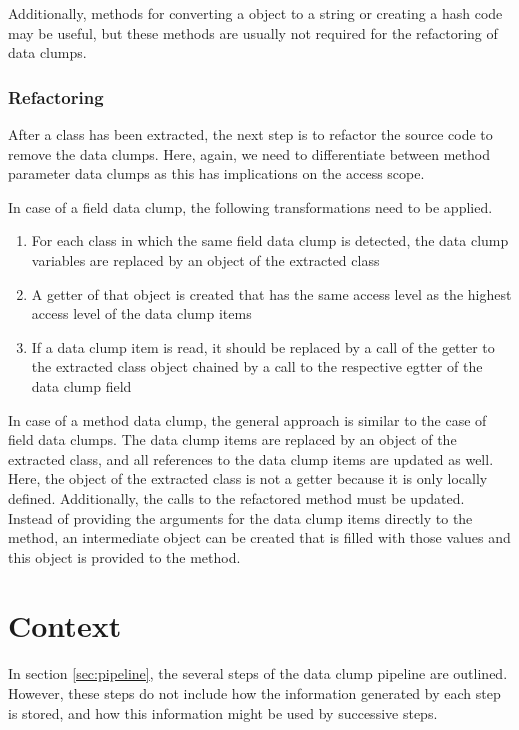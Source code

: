 Additionally, methods for converting a object to a string or creating a hash code may be useful, but these methods are usually not required for the refactoring of data clumps. 


\subsubsection{Refactoring}
After a class has been extracted, the next step is to refactor the source code to remove the data clumps. Here, again, we need to differentiate between method parameter data clumps as this has implications on the access scope. 

In case of a field data clump, the following transformations need to be applied.

\begin{enumerate}
    \item For each class in which the same field data clump is detected, the data clump variables are replaced by an object of the extracted class
    \item A getter of that object is created that has the same access level as the highest access level of the data clump items
    \item If a data clump item is read, it should be replaced by a call of the getter to the extracted class object chained by a call to the respective egtter of the data clump field
\end{enumerate}



In case of a method data clump, the general approach is similar to the case of field data clumps. The data clump items are replaced by an object of the extracted class, and all references to the data clump items are updated as well. Here, the object of the extracted class is not a getter because it is only locally defined. Additionally, the calls to the refactored method must be updated. Instead of providing the arguments for the data clump items directly to the method, an intermediate object can be created that is filled with those values and this object is provided to the method. 


\section{Context}
In section \ref{sec:pipeline}, the several steps of the data clump pipeline are outlined. However, these steps do not include how the information generated by each step is stored, and how this information might be used by successive steps.

